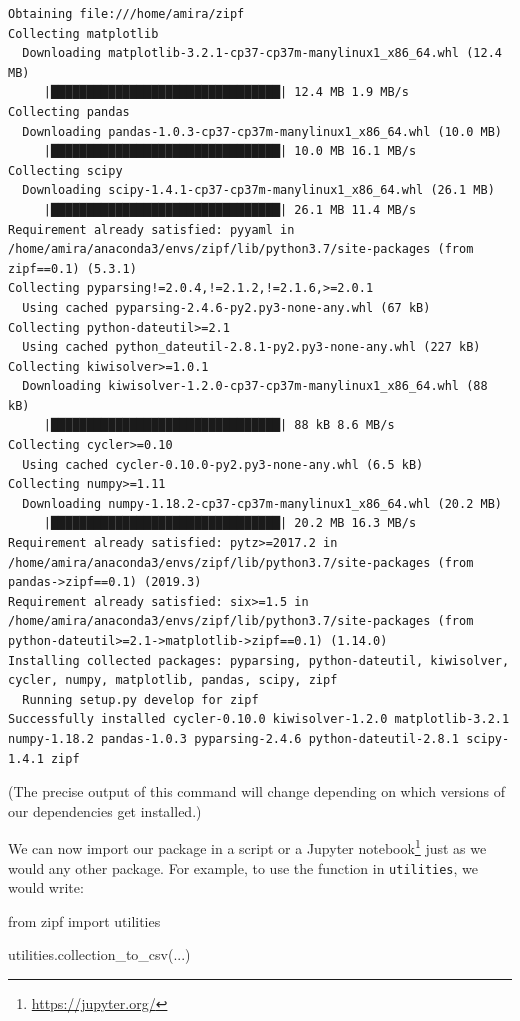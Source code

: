 \documentclass[
]{krantz}
\makeatletter
\newenvironment{Shaded}{\begin{snugshade}}{\end{snugshade}}
\newcommand{\ImportTok}[1]{#1}
\newcommand{\NormalTok}[1]{#1}
\renewcommand{\href}[2]{#2\footnote{\url{#1}}}
\newenvironment{kframe}{%
\medskip{}
\setlength{\fboxsep}{.8em}
 \def\at@end@of@kframe{}%
 \ifinner\ifhmode%
  \def\at@end@of@kframe{\end{minipage}}%
  \begin{minipage}{\columnwidth}%
 \fi\fi%
 \def\FrameCommand##1{\hskip\@totalleftmargin \hskip-\fboxsep
 \colorbox{shadecolor}{##1}\hskip-\fboxsep
     \hskip-\linewidth \hskip-\@totalleftmargin \hskip\columnwidth}%
 \MakeFramed {\advance\hsize-\width
   \@totalleftmargin\z@ \linewidth\hsize
   \@setminipage}}%
 {\par\unskip\endMakeFramed%
 \at@end@of@kframe}
\renewenvironment{Shaded}{\begin{kframe}}{\end{kframe}}
\makeatother
\begin{document}
\begin{verbatim}
Obtaining file:///home/amira/zipf
Collecting matplotlib
  Downloading matplotlib-3.2.1-cp37-cp37m-manylinux1_x86_64.whl (12.4 MB)
     |████████████████████████████████| 12.4 MB 1.9 MB/s
Collecting pandas
  Downloading pandas-1.0.3-cp37-cp37m-manylinux1_x86_64.whl (10.0 MB)
     |████████████████████████████████| 10.0 MB 16.1 MB/s
Collecting scipy
  Downloading scipy-1.4.1-cp37-cp37m-manylinux1_x86_64.whl (26.1 MB)
     |████████████████████████████████| 26.1 MB 11.4 MB/s
Requirement already satisfied: pyyaml in /home/amira/anaconda3/envs/zipf/lib/python3.7/site-packages (from zipf==0.1) (5.3.1)
Collecting pyparsing!=2.0.4,!=2.1.2,!=2.1.6,>=2.0.1
  Using cached pyparsing-2.4.6-py2.py3-none-any.whl (67 kB)
Collecting python-dateutil>=2.1
  Using cached python_dateutil-2.8.1-py2.py3-none-any.whl (227 kB)
Collecting kiwisolver>=1.0.1
  Downloading kiwisolver-1.2.0-cp37-cp37m-manylinux1_x86_64.whl (88 kB)
     |████████████████████████████████| 88 kB 8.6 MB/s
Collecting cycler>=0.10
  Using cached cycler-0.10.0-py2.py3-none-any.whl (6.5 kB)
Collecting numpy>=1.11
  Downloading numpy-1.18.2-cp37-cp37m-manylinux1_x86_64.whl (20.2 MB)
     |████████████████████████████████| 20.2 MB 16.3 MB/s
Requirement already satisfied: pytz>=2017.2 in /home/amira/anaconda3/envs/zipf/lib/python3.7/site-packages (from pandas->zipf==0.1) (2019.3)
Requirement already satisfied: six>=1.5 in /home/amira/anaconda3/envs/zipf/lib/python3.7/site-packages (from python-dateutil>=2.1->matplotlib->zipf==0.1) (1.14.0)
Installing collected packages: pyparsing, python-dateutil, kiwisolver, cycler, numpy, matplotlib, pandas, scipy, zipf
  Running setup.py develop for zipf
Successfully installed cycler-0.10.0 kiwisolver-1.2.0 matplotlib-3.2.1 numpy-1.18.2 pandas-1.0.3 pyparsing-2.4.6 python-dateutil-2.8.1 scipy-1.4.1 zipf
\end{verbatim}

(The precise output of this command will change
depending on which versions of our dependencies get installed.)

We can now import our package in a script or a \href{https://jupyter.org/}{Jupyter notebook}
just as we would any other package.
For example,
to use the function in \texttt{utilities},
we would write:

\begin{Shaded}
\begin{Highlighting}[]
\ImportTok{from}\NormalTok{ zipf }\ImportTok{import}\NormalTok{ utilities}


\NormalTok{utilities.collection\_to\_csv(...)}
\end{Highlighting}
\end{Shaded}
\end{document}
